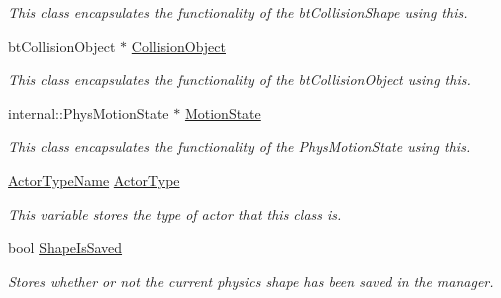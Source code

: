 \begin{DoxyCompactItemize}
\begin{DoxyCompactList}\small\item\em This class encapsulates the functionality of the btCollisionShape using this. \item\end{DoxyCompactList}\item 
\hypertarget{classphys_1_1ActorBase_a70676c52ffee64705a7b463d29b60429}{
btCollisionObject $\ast$ \hyperlink{classphys_1_1ActorBase_a70676c52ffee64705a7b463d29b60429}{CollisionObject}}
\label{d8/d0f/classphys_1_1ActorBase_a70676c52ffee64705a7b463d29b60429}

\begin{DoxyCompactList}\small\item\em This class encapsulates the functionality of the btCollisionObject using this. \item\end{DoxyCompactList}\item 
\hypertarget{classphys_1_1ActorBase_ab776527aa927b8787313c50530cc24ba}{
internal::PhysMotionState $\ast$ \hyperlink{classphys_1_1ActorBase_ab776527aa927b8787313c50530cc24ba}{MotionState}}
\label{d8/d0f/classphys_1_1ActorBase_ab776527aa927b8787313c50530cc24ba}

\begin{DoxyCompactList}\small\item\em This class encapsulates the functionality of the PhysMotionState using this. \item\end{DoxyCompactList}\item 
\hypertarget{classphys_1_1ActorBase_a42baa3657656300eeefe3ed48f526a00}{
\hyperlink{classphys_1_1ActorBase_aff3a7c464e8ce82576073f8f891434b7}{ActorTypeName} \hyperlink{classphys_1_1ActorBase_a42baa3657656300eeefe3ed48f526a00}{ActorType}}
\label{d8/d0f/classphys_1_1ActorBase_a42baa3657656300eeefe3ed48f526a00}

\begin{DoxyCompactList}\small\item\em This variable stores the type of actor that this class is. \item\end{DoxyCompactList}\item 
\hypertarget{classphys_1_1ActorBase_a22c0ab01bdc3e1e5c656fb0f201f6929}{
bool \hyperlink{classphys_1_1ActorBase_a22c0ab01bdc3e1e5c656fb0f201f6929}{ShapeIsSaved}}
\label{d8/d0f/classphys_1_1ActorBase_a22c0ab01bdc3e1e5c656fb0f201f6929}

\begin{DoxyCompactList}\small\item\em Stores whether or not the current physics shape has been saved in the manager. \item\end{DoxyCompactList}\end{DoxyCompactItemize}
